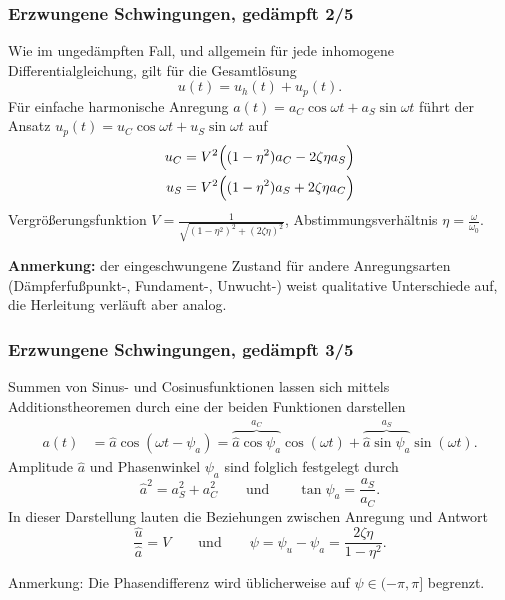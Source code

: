 \documentclass[hyperref={pdfpagemode=FullScreen, colorlinks=false}]{beamer}
\begin{document}
\begin{frame}
\frametitle{Erzwungene Schwingungen, {\normalsize gedämpft 2/5}}
Wie im ungedämpften Fall, und allgemein für jede inhomogene Differentialgleichung, gilt für die Gesamtlösung
\begin{equation*}
 u(t)=u_h(t)+u_p(t).
\end{equation*}
Für einfache harmonische Anregung $a(t)=a_C\cos\omega t + a_S \sin \omega t$
führt der Ansatz $u_p(t)=u_C\cos\omega t + u_S\sin\omega t$ auf
\begin{align*}
u_C&= V^2 \Bigl( (1-\eta^2)a_C-2\zeta\eta a_S \Bigl)\\
u_S&= V^2 \Bigl( (1-\eta^2)a_S+2\zeta\eta a_C \Bigl)
\end{align*}
Vergrößerungsfunktion $V=\frac{1}{\sqrt{(1-\eta^2)^2+(2\zeta\eta)^2}}$, \hfill Abstimmungsverhältnis $\eta= \frac{\omega}{\omega_0}$.
\smallskip
\begin{center}
 \textbf{Anmerkung:} der eingeschwungene Zustand für andere Anregungsarten (Dämpferfußpunkt-, Fundament-, Unwucht-) weist qualitative Unterschiede auf, die Herleitung verläuft aber analog.
\end{center}
\end{frame}

\begin{frame}
\frametitle{Erzwungene Schwingungen, {\normalsize gedämpft 3/5}}
Summen von Sinus- und Cosinusfunktionen lassen sich mittels
Additionstheoremen durch eine der beiden Funktionen darstellen
\begin{align*}
a(t)&= \hat{a}\cos(\omega t - \psi_a) = 
 \overbrace{\hat{a}\cos\psi_a}^{a_C} \cos(\omega t) +
 \overbrace{\hat{a}\sin\psi_a}^{a_S} \sin(\omega t).%
 \end{align*}
 Amplitude $\hat{a}$ und Phasenwinkel $\psi_a$ sind folglich festgelegt durch
 \begin{equation*}
  \hat{a}^2 = a_S^2+a_C^2 \qquad \text{und} \qquad
  \tan\psi_a = \frac{a_S}{a_C}. 
\end{equation*}
In dieser Darstellung lauten die Beziehungen zwischen Anregung und Antwort
\begin{equation*}
\frac{\hat{u}}{\hat{a}}=V \qquad \text{und} \qquad
\psi=\psi_u -\psi_a =  \frac{2\zeta\eta}{1-\eta^2}.
\end{equation*}

Anmerkung: Die Phasendifferenz wird üblicherweise auf $\psi\in(-\pi,\pi]$ begrenzt.
\end{frame}
\end{document}
